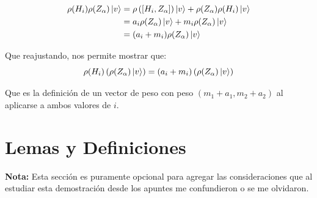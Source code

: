 \documentclass[12pt]{exam}
\begin{document}
\begin{align*}
  \rho(H_i)\rho(Z_\alpha)\ket{v} &= \rho\left([H_i, Z_\alpha]\right)\ket{v} + \rho(Z_\alpha)\rho(H_i)\ket{v}\\
  &= a_i \rho(Z_\alpha)\ket{v} + m_i \rho(Z_\alpha)\ket{v}\\
  &= (a_i + m_i) \rho(Z_\alpha) \ket{v}
\end{align*}

Que reajustando, nos permite mostrar que:
\begin{equation}
  \rho(H_i)\left(\rho(Z_\alpha)\ket{v}\right) = (a_i + m_i) \left(\rho(Z_\alpha) \ket{v}\right)
  \label{eq:result}
\end{equation}

Que es la definición de un vector de peso con peso $(m_1 + a_1, m_2 + a_2)$ al aplicarse a ambos valores de $i$.

\section{Lemas y Definiciones}
\textbf{Nota:} Esta sección es puramente opcional para agregar las consideraciones que al estudiar esta demostración desde los apuntes me confundieron o se me olvidaron.
\end{document}
